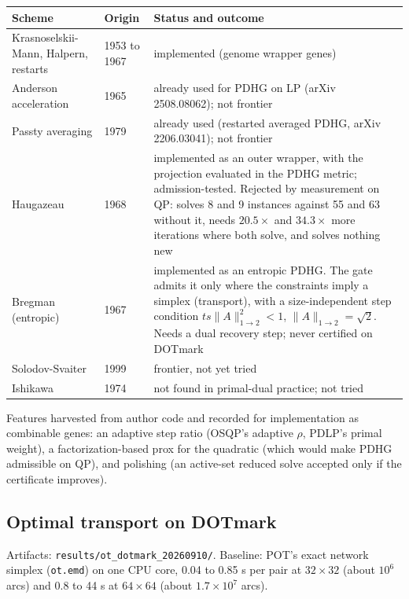 \begin{center}
\small
\begin{tabular}{p{2.6cm}p{2.2cm}p{7.6cm}}
\toprule
Scheme & Origin & Status and outcome \\
\midrule
Krasnoselskii-Mann, Halpern, restarts & 1953 to 1967 & implemented (genome wrapper genes) \\
Anderson acceleration & 1965 & already used for PDHG on LP (arXiv 2508.08062); not frontier \\
Passty averaging & 1979 & already used (restarted averaged PDHG, arXiv 2206.03041); not frontier \\
Haugazeau & 1968 & implemented as an outer wrapper, with the projection evaluated in the PDHG metric; admission-tested. Rejected by measurement on QP: solves 8 and 9 instances against 55 and 63 without it, needs $20.5\times$ and $34.3\times$ more iterations where both solve, and solves nothing new \\
Bregman (entropic) & 1967 & implemented as an entropic PDHG. The gate admits it only where the constraints imply a simplex (transport), with a size-independent step condition $t s \|A\|_{1\to2}^2<1$, $\|A\|_{1\to2}=\sqrt2$. Needs a dual recovery step; never certified on DOTmark \\
Solodov-Svaiter & 1999 & frontier, not yet tried \\
Ishikawa & 1974 & not found in primal-dual practice; not tried \\
\bottomrule
\end{tabular}
\end{center}

Features harvested from author code and recorded for implementation as
combinable genes: an adaptive step ratio (OSQP's adaptive $\rho$, PDLP's
primal weight), a factorization-based prox for the quadratic (which would
make PDHG admissible on QP), and polishing (an active-set reduced solve
accepted only if the certificate improves).

\subsection{Optimal transport on DOTmark}
\label{app:log:ot}

Artifacts: \texttt{results/ot\_dotmark\_20260910/}. Baseline: POT's exact
network simplex (\texttt{ot.emd}) on one CPU core, 0.04 to 0.85 s per pair at
$32\times32$ (about $10^6$ arcs) and 0.8 to 44 s at $64\times64$ (about
$1.7\times10^7$ arcs).

